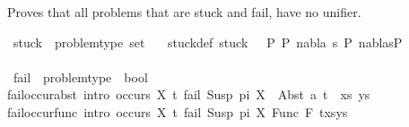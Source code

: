 %
\begin{isabellebody}%
%
%
\isadelimtheory
%
\endisadelimtheory
%
\isatagtheory
%
\endisatagtheory
{\isafoldtheory}%
%
\isadelimtheory
%
\endisadelimtheory
%
\isadelimdocument
%
\endisadelimdocument
%
\isatagdocument
%
\isamarkuptrue%
%
\endisatagdocument
{\isafolddocument}%
%
\isadelimdocument
%
\endisadelimdocument
%
\begin{isamarkuptext}%
Proves that all problems that are stuck and fail, have no unifier.%
\end{isamarkuptext}\isamarkuptrue%
\isamarkupfalse%
\ stuck\ {\isacharcolon}{\kern0pt}{\isacharcolon}{\kern0pt}\ {\isachardoublequoteopen}problem{\isacharunderscore}{\kern0pt}type\ set{\isachardoublequoteclose}\ \isanewline
\ \ stuck{\isacharunderscore}{\kern0pt}def{\isacharcolon}{\kern0pt}\ {\isachardoublequoteopen}stuck\ {\isasymequiv}\ {\isacharbraceleft}{\kern0pt}\ P{}{\isachardot}{\kern0pt}\ {\isasymnot}{\isacharparenleft}{\kern0pt}{\isasymexists}P{}\ nabla\ s{\isachardot}{\kern0pt}\ P{}\ {\isasymTurnstile}{\isacharparenleft}{\kern0pt}nabla{\isacharcomma}{\kern0pt}s{\isacharparenright}{\kern0pt}{\isasymRightarrow}P{}{\isacharparenright}{\kern0pt}{\isacharbraceright}{\kern0pt}{\isachardoublequoteclose}\isanewline
\isanewline
\ \ \ \ \ \ \ \ \ \ \ \ \ \ \ \ \ \ \ \ \ \ \ \ \ \ \ \ \ \ \ \ \ \ \ \ \ \ \ \ \ \ \ \ \ \ \ \ \ \ \ \ \ \ \ \ \isanewline
{}\isamarkupfalse%
\ fail\ {\isacharcolon}{\kern0pt}{\isacharcolon}{\kern0pt}\ {\isachardoublequoteopen}problem{\isacharunderscore}{\kern0pt}type\ {\isasymRightarrow}\ bool{\isachardoublequoteclose}\ \isanewline
fail{\isacharunderscore}{\kern0pt}occur{\isacharunderscore}{\kern0pt}abst\ {\isacharbrackleft}{\kern0pt}intro{\isacharbang}{\kern0pt}{\isacharbrackright}{\kern0pt}{\isacharcolon}{\kern0pt}\ {\isachardoublequoteopen}{\isasymlbrakk}occurs\ X\ t{\isasymrbrakk}{\isasymLongrightarrow}\ fail\ {\isacharparenleft}{\kern0pt}{\isacharparenleft}{\kern0pt}Susp\ pi\ X\ {\isasymapprox}{\isacharquery}{\kern0pt}\ Abst\ a\ t{\isacharparenright}{\kern0pt}\ {\isacharhash}{\kern0pt}\ xs{\isacharcomma}{\kern0pt}\ ys{\isacharparenright}{\kern0pt}{\isachardoublequoteclose}\ {\isacharbar}{\kern0pt}\isanewline
fail{\isacharunderscore}{\kern0pt}occur{\isacharunderscore}{\kern0pt}func\ {\isacharbrackleft}{\kern0pt}intro{\isacharbang}{\kern0pt}{\isacharbrackright}{\kern0pt}{\isacharcolon}{\kern0pt}\ {\isachardoublequoteopen}{\isasymlbrakk}occurs\ X\ t{\isasymrbrakk}{\isasymLongrightarrow}\ fail\ {\isacharparenleft}{\kern0pt}Susp\ pi\ X\ {\isasymapprox}{\isacharquery}{\kern0pt}Func\ F\ t{\isacharhash}{\kern0pt}xs{\isacharcomma}{\kern0pt}ys{\isacharparenright}{\kern0pt}{\isachardoublequoteclose}\ {\isacharbar}{\kern0pt}\isanewline

\end{isabellebody}
